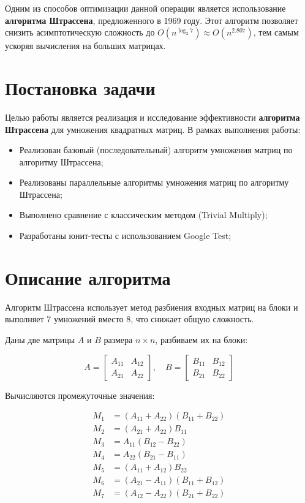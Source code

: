\documentclass[14pt,a4paper]{extarticle}
\begin{document}
Одним из способов оптимизации данной операции является использование \textbf{алгоритма Штрассена}, предложенного в 1969 году. Этот алгоритм позволяет снизить асимптотическую сложность до $O(n^{\log_2 7}) \approx O(n^{2.807})$, тем самым ускоряя вычисления на больших матрицах.

\section{Постановка задачи}

Целью работы является реализация и исследование эффективности \textbf{алгоритма Штрассена} для умножения квадратных матриц. В рамках выполнения работы:

\begin{itemize}
    \item Реализован базовый (последовательный) алгоритм умножения матриц по алгоритму Штрассена;
    \item Реализованы параллельные алгоритмы умножения матриц по алгоритму Штрассена;
    \item Выполнено сравнение с классическим методом (Trivial Multiply);
    \item Разработаны юнит-тесты с использованием Google Test;
\end{itemize}

\section{Описание алгоритма}

Алгоритм Штрассена использует метод разбиения входных матриц на блоки и выполняет 7 умножений вместо 8, что снижает общую сложность.

Даны две матрицы $A$ и $B$ размера $n \times n$, разбиваем их на блоки:

\[
A = \begin{bmatrix}
A_{11} & A_{12} \\
A_{21} & A_{22}
\end{bmatrix}, \quad
B = \begin{bmatrix}
B_{11} & B_{12} \\
B_{21} & B_{22}
\end{bmatrix}
\]

Вычисляются промежуточные значения:

\[
\begin{aligned}
M_1 &= (A_{11} + A_{22})(B_{11} + B_{22}) \\
M_2 &= (A_{21} + A_{22})B_{11} \\
M_3 &= A_{11}(B_{12} - B_{22}) \\
M_4 &= A_{22}(B_{21} - B_{11}) \\
M_5 &= (A_{11} + A_{12})B_{22} \\
M_6 &= (A_{21} - A_{11})(B_{11} + B_{12}) \\
M_7 &= (A_{12} - A_{22})(B_{21} + B_{22})
\end{aligned}
\]
\end{document}
